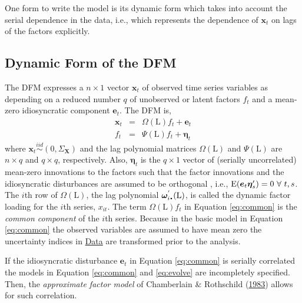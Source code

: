 \documentclass[12pt,twoside]{reedthesis}
\begin{document}
One form to write the model is its dynamic form which takes into account the serial dependence in the data, i.e., which represents the dependence of \(\bm x_{t}\) on lags of the factors explicitly.

\hypertarget{dynamic-form-of-the-dfm}{%
\subsection{Dynamic Form of the DFM}\label{dynamic-form-of-the-dfm}}

The DFM expresses a \(n \times 1\) vector \(\bm x_{t}\) of observed time series variables as depending on a reduced number \(q\) of unobserved or latent factors \(f_{t}\) and a mean-zero idiosyncratic component \(\bm e_{t}\). The DFM is,
\begin{eqnarray}
  \bm x_{t} & = & \bm \varOmega(\ensuremath{\mathrm{L}}) f_{t} + \bm e_{t} \label{eq:common}
  \\
  f_{t} & = & \bm \varPsi(\ensuremath{\mathrm{L}}) f_{t} + \bm \eta_{t} \label{eq:evolve}
\end{eqnarray}
where \(\bm x_{t} \stackrel{iid}{\sim} (0, \bm \varSigma_{\bm X})\) and the lag polynomial matrices \(\bm \varOmega(\ensuremath{\mathrm{L}})\) and \(\bm \varPsi(\ensuremath{\mathrm{L}})\) are \(n \times q\) and \(q \times q\), respectively. Also, \(\bm \eta_{t}\) is the \(q \times 1\) vector of (serially uncorrelated) mean-zero innovations to the factors such that the factor innovations and the idiosyncratic disturbances are assumed to be orthogonal , i.e., \(\operatorname{E}(\bm e_{t}\bm \eta_{s}') = 0 ~ \forall ~ t, s\). The \(i\)th row of \(\bm \varOmega(\ensuremath{\mathrm{L}})\), the lag polynomial \(\bm \omega_{i \bcdot}^{'}(\ensuremath{\mathrm{L}})\), is called the dynamic factor loading for the \(i\)th series, \(x_{it}\). The term \(\bm \varOmega(\ensuremath{\mathrm{L}}) f_{t}\) in Equation \eqref{eq:common} is the \emph{common component} of the \(i\)th series. Because in the basic model in Equation \eqref{eq:common} the observed variables are assumed to have mean zero the uncertainty indices in \protect\hyperlink{data}{Data} are transformed prior to the analysis.

If the idiosyncratic disturbance \(\bm e_{t}\) in Equation \eqref{eq:common} is serially correlated the models in Equation \eqref{eq:common} and \eqref{eq:evolve} are incompletely specified. Then, the \emph{approximate factor model} of Chamberlain \& Rothschild (\protect\hyperlink{ref-chamroth:1983}{1983}) allows for such correlation.
\end{document}
